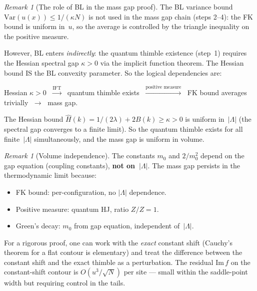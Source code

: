 \documentclass[12pt]{article}
\theoremstyle{definition}
\theoremstyle{remark}
\newtheorem{remark}[theorem]{Remark}
\newcommand{\Var}{\mathrm{Var}}
\newcommand{\La}{\Lambda}
\newcommand{\im}{\mathrm{Im}}
\begin{document}
\begin{remark}[The role of BL in the mass gap proof]
The BL variance bound $\Var(u(x)) \le 1/(\kappa N)$ is not
used in the mass gap chain (steps 2--4): the FK bound is
uniform in~$u$, so the average is controlled by the triangle
inequality on the positive measure.

However, BL enters \emph{indirectly}: the quantum thimble
existence (step~1) requires the Hessian spectral gap $\kappa > 0$
via the implicit function theorem. The Hessian bound IS the
BL convexity parameter. So the logical dependencies are:
\begin{center}
Hessian $\kappa > 0$ $\;\xrightarrow{\text{IFT}}\;$
quantum thimble exists $\;\xrightarrow{\text{positive measure}}\;$
FK bound averages trivially $\;\to\;$ mass gap.
\end{center}
The Hessian bound $\hat{H}(k) = 1/(2\lambda) + 2B(k) \ge \kappa > 0$
is uniform in~$|\La|$ (the spectral gap converges to a finite
limit). So the quantum thimble exists for all finite~$|\La|$
simultaneously, and the mass gap is uniform in volume.
\end{remark}

\begin{remark}[Volume independence]
The constants $m_0$ and $2/m_0^2$ depend on the gap equation
(coupling constants), \textbf{not on~$|\La|$}. The mass gap
persists in the thermodynamic limit because:
\begin{itemize}
\item FK bound: per-configuration, no $|\La|$ dependence.
\item Positive measure: quantum HJ, ratio $Z/Z = 1$.
\item Green's decay: $m_0$ from gap equation, independent of~$|\La|$.
\end{itemize}

For a rigorous proof, one can work with the \emph{exact} constant
shift (Cauchy's theorem for a flat contour is elementary) and treat
the difference between the constant shift and the exact thimble
as a perturbation. The residual $\im\,f$ on the constant-shift
contour is $O(u^3/\sqrt{N})$ per site --- small within the
saddle-point width but requiring control in the tails.
\end{remark}
\end{document}
